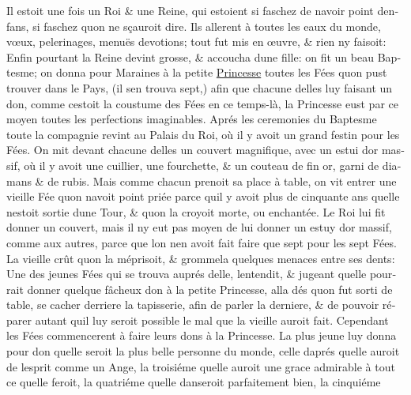 \documentclass[14pt,a4paper]{memoir}
\newcommand{\ul}[1]{\uline{#1}}
\begin{document}
{{\begin{otherlanguage}{french}
Il estoit une fois un Roi \& une Reine, qui estoient si faschez de
n\textquotesingle avoir point d\textquotesingle enfans, si faschez
qu\textquotesingle on ne sçauroit dire. Ils allerent à toutes les eaux
du monde, vœux, pelerinages, menuës devotions; tout fut mis en œuvre, \&
rien n\textquotesingle y faisoit: Enfin pourtant la Reine devint grosse,
\& accoucha d\textquotesingle une fille: on fit un beau Baptesme; on
donna pour Maraines à la petite \ul{Princesse} toutes les Fées
qu\textquotesingle on pust trouver dans le Pays, (il
s\textquotesingle en trouva sept,) afin que chacune
d\textquotesingle elles luy faisant un don, comme
c\textquotesingle estoit la coustume des Fées en ce temps-là, la
Princesse eust par ce moyen toutes les perfections imaginables. Aprés
les ceremonies du Baptesme toute la compagnie revint au Palais du Roi,
où il y avoit un grand festin pour les Fées. On mit devant chacune
d\textquotesingle elles un couvert magnifique, avec un estui
d\textquotesingle or massif, où il y avoit une cuillier, une fourchette,
\& un couteau de fin or, garni de diamans \& de rubis. Mais comme chacun
prenoit sa place à table, on vit entrer une vieille Fée
qu\textquotesingle on n\textquotesingle avoit point priée parce
qu\textquotesingle il y avoit plus de cinquante ans
qu\textquotesingle elle n\textquotesingle estoit sortie
d\textquotesingle une Tour, \& qu\textquotesingle on la croyoit morte,
ou enchantée. Le Roi lui fit donner un couvert, mais il
n\textquotesingle y eut pas moyen de lui donner un estuy
d\textquotesingle or massif, comme aux autres, parce que
l\textquotesingle on n\textquotesingle en avoit fait faire que sept pour
les sept Fées. La vieille crût qu\textquotesingle on la méprisoit, \&
grommela quelques menaces entre ses dents: Une des jeunes Fées qui se
trouva auprés d\textquotesingle elle, l\textquotesingle entendit, \&
jugeant qu\textquotesingle elle pourrait donner quelque fâcheux don à la
petite Princesse, alla dés qu\textquotesingle on fut sorti de table, se
cacher derriere la tapisserie, afin de parler la derniere, \& de pouvoir
réparer autant qu\textquotesingle il luy seroit possible le mal que la
vieille auroit fait. Cependant les Fées commencerent à faire leurs dons
à la Princesse. La plus jeune luy donna pour don qu\textquotesingle elle
seroit la plus belle personne du monde, celle d\textquotesingle aprés
qu\textquotesingle elle auroit de l\textquotesingle esprit comme un
Ange, la troisiéme qu\textquotesingle elle auroit une grace admirable à
tout ce qu\textquotesingle elle feroit, la quatriéme
qu\textquotesingle elle danseroit parfaitement bien, la cinquiéme

\end{otherlanguage}}}
\end{document}

